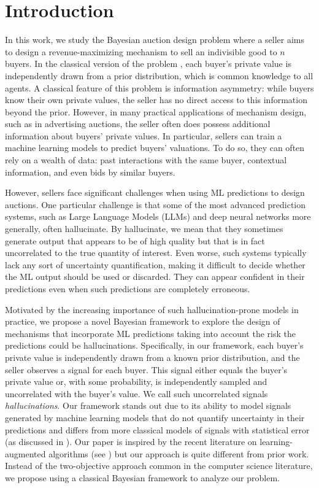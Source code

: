 \section{Introduction}\label{sec:intro}

In this work, we study the Bayesian auction design problem where a seller aims to design a revenue-maximizing mechanism to sell an indivisible good to $n$ buyers. In the classical version of the problem \citep{myerson1981optimal}, each buyer's private value is independently drawn from a prior distribution, which is common knowledge to all agents. A classical feature of this problem is information asymmetry: while buyers know their own private values, the seller has no direct access to this information beyond the prior. However, in many practical applications of mechanism design, such as in advertising auctions, the seller often does possess additional information about buyers' private values. In particular, sellers can train a machine learning models to predict buyers' valuations. To do so, they can often rely on a wealth of data: past interactions with the same buyer, contextual information, and even bids by similar buyers.

However, sellers face significant challenges when using ML predictions to design auctions. One particular challenge is that some of the most advanced prediction systems, such as Large Language Models (LLMs) and deep neural networks more generally, often hallucinate. By hallucinate, we mean that they sometimes generate output that appears to be of high quality but that is in fact uncorrelated to the true quantity of interest. Even worse, such systems typically lack any sort of uncertainty quantification, making it difficult to decide whether the ML output should be used or discarded. They can appear confident in their predictions even when such predictions are completely erroneous. 


Motivated by the increasing importance of such hallucination-prone models in practice, we propose a novel Bayesian framework to explore the design of mechanisms that incorporate ML predictions taking into account the risk the predictions could be hallucinations. Specifically, in our framework, each buyer's private value is independently drawn from a known prior distribution, and the seller observes a signal for each buyer. This signal either equals the buyer's private value or, with some probability, is independently sampled and uncorrelated with the buyer's value. We call such uncorrelated signals  \textit{hallucinations}. 
Our framework stands out due to its ability to model signals generated by machine learning models that do not quantify uncertainty in their predictions and differs from more classical models of signals with statistical error (as discussed in ). Our paper is inspired by the recent literature on learning-augmented algorithms (see ) but our approach is quite different from prior work. Instead of the two-objective approach common in the computer science literature, we propose using a classical Bayesian framework to analyze our problem. 


